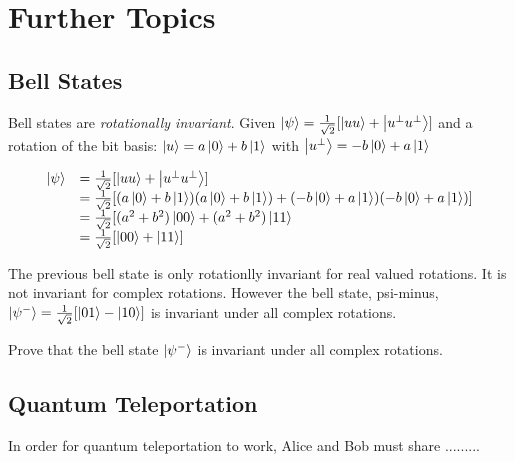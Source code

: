 
\chapter{Further Topics}





\section{Bell States}


Bell states are \textit{rotationally invariant}.
Given $\left|\psi\right\rangle = \frac{1}{\sqrt{2}} [\left|uu\right\rangle + \left|u^{\perp}u^{\perp}\right\rangle]$ 
and a rotation of the bit basis:
$\left|u\right\rangle = a\left|0\right\rangle + b\left|1\right\rangle$ with $\left|u^{\perp}\right\rangle = -b\left|0\right\rangle + a\left|1\right\rangle$


\[ \begin{array}{ll}
\left|\psi\right\rangle
& =
\frac{1}{\sqrt{2}} [\left|uu\right\rangle + \left|u^{\perp}u^{\perp}\right\rangle] \\
& =
\frac{1}{\sqrt{2}} [(a\left|0\right\rangle + b\left|1\right\rangle)(a\left|0\right\rangle + b\left|1\right\rangle) 
+ (-b\left|0\right\rangle + a\left|1\right\rangle)(-b\left|0\right\rangle + a\left|1\right\rangle)]  \\ 
& =
\frac{1}{\sqrt{2}} [(a^2 + b^2)\left|00\right\rangle + (a^2 + b^2)\left|11\right\rangle \\ 
& =
\frac{1}{\sqrt{2}} [\left|00\right\rangle + \left|11\right\rangle] \\ 
\end{array}\] 

\frmrule

The previous bell state is only rotationlly invariant for real valued rotations. 
It is not invariant for complex rotations. However the bell state, 
psi-minus, $\left|\psi^{-}\right\rangle = \frac{1}{\sqrt{2}} [\left|01\right\rangle - \left|10\right\rangle]$
is invariant under all complex rotations.

\frmrule

\begin{example}
Prove that the bell state $\left|\psi^{-}\right\rangle$ is invariant under all complex rotations.
\end{example}

\frmrule




\section{Quantum Teleportation}

\begin{example}
In order for quantum teleportation to work, Alice and Bob must share .........
\end{example}



